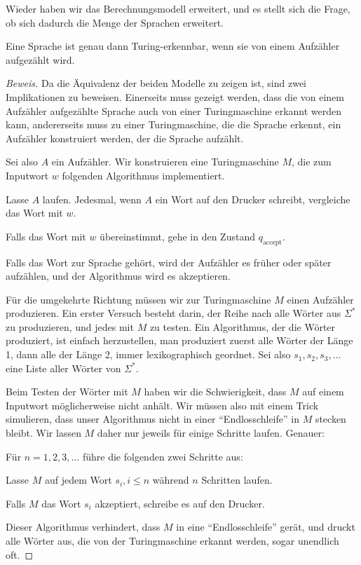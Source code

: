 Wieder haben wir das Berechnungsmodell erweitert, und es stellt sich
die Frage, ob sich dadurch die Menge der Sprachen erweitert.

\begin{satz}
%
Eine Sprache ist genau dann Turing-erkennbar, wenn sie
von einem Aufzähler aufgezählt wird.\end{satz}

\begin{proof}[Beweis]
Da die Äquivalenz der beiden Modelle zu zeigen ist, sind zwei Implikationen
zu beweisen. Einerseits muss gezeigt werden, dass die von einem
Aufzähler aufgezählte Sprache auch von einer Turingmaschine
erkannt werden kann, andererseits muss zu einer Turingmaschine, die
die Sprache erkennt, ein Aufzähler konstruiert werden, der die Sprache
aufzählt.

Sei also $A$ ein Aufzähler. Wir konstruieren eine Turingmaschine $M$, die
zum Inputwort $w$ folgenden Algorithmus implementiert.
\begin{compactenum}
\item Lasse $A$ laufen. Jedesmal, wenn $A$ ein Wort auf den Drucker schreibt,
vergleiche das Wort mit $w$.
\item Falls das Wort mit $w$ übereinstimmt, gehe in den Zustand
$q_{\text{accept}}$.
\end{compactenum}
Falls das Wort zur Sprache gehört, wird der Aufzähler es früher
oder später aufzählen, und der Algorithmus wird es akzeptieren.

Für die umgekehrte Richtung müssen wir zur Turingmaschine $M$
einen Aufzähler produzieren.
Ein erster Versuch besteht darin, der Reihe nach alle Wörter aus
$\Sigma^*$ zu produzieren, und jedes mit $M$ zu testen.
Ein Algorithmus, der die Wörter produziert, ist einfach herzustellen,
man produziert zuerst alle Wörter der Länge 1, dann alle der Länge 2,
immer lexikographisch geordnet.
Sei also $s_1,s_2,s_3,\dots$ eine Liste aller Wörter von $\Sigma^*$.

Beim Testen der Wörter mit $M$
haben wir die Schwierigkeit, dass $M$ auf einem Inputwort
möglicherweise nicht anhält. Wir müssen also mit einem Trick
simulieren, dass unser Algorithmus nicht in einer ``Endlosschleife''
in $M$ stecken bleibt. Wir lassen $M$ daher nur jeweils für einige
Schritte laufen.
Genauer:
\begin{compactenum}
\item Für $n=1,2,3,\dots$ führe die folgenden zwei Schritte aus:
\item Lasse $M$ auf jedem Wort $s_i, i \le n$ während $n$ Schritten
laufen.
\item Falls $M$ das Wort $s_i$ akzeptiert, schreibe es auf den Drucker.
\end{compactenum}
Dieser Algorithmus verhindert, dass $M$ in eine ``Endlosschleife''
gerät, und druckt alle Wörter aus, die von der Turingmaschine erkannt
werden, sogar unendlich oft.
\end{proof}

